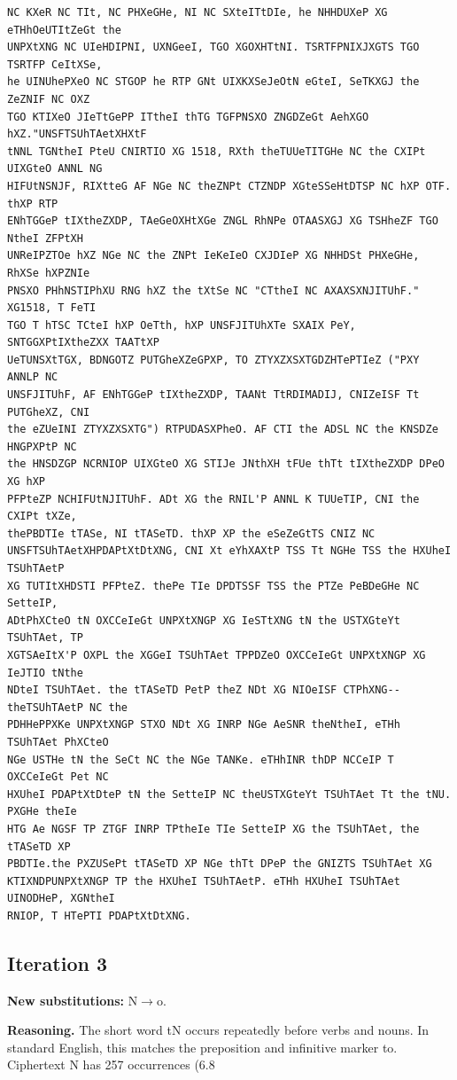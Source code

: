 \documentclass[12pt,a4paper]{article}
\begin{document}
\begin{lstlisting}[caption={Complete text after iteration 2}, label={lst:iter2}]
NC KXeR NC TIt, NC PHXeGHe, NI NC SXteITtDIe, he NHHDUXeP XG eTHhOeUTItZeGt the
UNPXtXNG NC UIeHDIPNI, UXNGeeI, TGO XGOXHTtNI. TSRTFPNIXJXGTS TGO TSRTFP CeItXSe,
he UINUhePXeO NC STGOP he RTP GNt UIXKXSeJeOtN eGteI, SeTKXGJ the ZeZNIF NC OXZ
TGO KTIXeO JIeTtGePP ITtheI thTG TGFPNSXO ZNGDZeGt AehXGO hXZ."UNSFTSUhTAetXHXtF
tNNL TGNtheI PteU CNIRTIO XG 1518, RXth theTUUeTITGHe NC the CXIPt UIXGteO ANNL NG
HIFUtNSNJF, RIXtteG AF NGe NC theZNPt CTZNDP XGteSSeHtDTSP NC hXP OTF. thXP RTP
ENhTGGeP tIXtheZXDP, TAeGeOXHtXGe ZNGL RhNPe OTAASXGJ XG TSHheZF TGO NtheI ZFPtXH
UNReIPZTOe hXZ NGe NC the ZNPt IeKeIeO CXJDIeP XG NHHDSt PHXeGHe, RhXSe hXPZNIe
PNSXO PHhNSTIPhXU RNG hXZ the tXtSe NC "CTtheI NC AXAXSXNJITUhF." XG1518, T FeTI
TGO T hTSC TCteI hXP OeTth, hXP UNSFJITUhXTe SXAIX PeY, SNTGGXPtIXtheZXX TAATtXP
UeTUNSXtTGX, BDNGOTZ PUTGheXZeGPXP, TO ZTYXZXSXTGDZHTePTIeZ ("PXY ANNLP NC
UNSFJITUhF, AF ENhTGGeP tIXtheZXDP, TAANt TtRDIMADIJ, CNIZeISF Tt PUTGheXZ, CNI
the eZUeINI ZTYXZXSXTG") RTPUDASXPheO. AF CTI the ADSL NC the KNSDZe HNGPXPtP NC
the HNSDZGP NCRNIOP UIXGteO XG STIJe JNthXH tFUe thTt tIXtheZXDP DPeO XG hXP
PFPteZP NCHIFUtNJITUhF. ADt XG the RNIL'P ANNL K TUUeTIP, CNI the CXIPt tXZe,
thePBDTIe tTASe, NI tTASeTD. thXP XP the eSeZeGtTS CNIZ NC
UNSFTSUhTAetXHPDAPtXtDtXNG, CNI Xt eYhXAXtP TSS Tt NGHe TSS the HXUheI TSUhTAetP
XG TUTItXHDSTI PFPteZ. thePe TIe DPDTSSF TSS the PTZe PeBDeGHe NC SetteIP,
ADtPhXCteO tN OXCCeIeGt UNPXtXNGP XG IeSTtXNG tN the USTXGteYt TSUhTAet, TP
XGTSAeItX'P OXPL the XGGeI TSUhTAet TPPDZeO OXCCeIeGt UNPXtXNGP XG IeJTIO tNthe
NDteI TSUhTAet. the tTASeTD PetP theZ NDt XG NIOeISF CTPhXNG--theTSUhTAetP NC the
PDHHePPXKe UNPXtXNGP STXO NDt XG INRP NGe AeSNR theNtheI, eTHh TSUhTAet PhXCteO
NGe USTHe tN the SeCt NC the NGe TANKe. eTHhINR thDP NCCeIP T OXCCeIeGt Pet NC
HXUheI PDAPtXtDteP tN the SetteIP NC theUSTXGteYt TSUhTAet Tt the tNU. PXGHe theIe
HTG Ae NGSF TP ZTGF INRP TPtheIe TIe SetteIP XG the TSUhTAet, the tTASeTD XP
PBDTIe.the PXZUSePt tTASeTD XP NGe thTt DPeP the GNIZTS TSUhTAet XG
KTIXNDPUNPXtXNGP TP the HXUheI TSUhTAetP. eTHh HXUheI TSUhTAet UINODHeP, XGNtheI
RNIOP, T HTePTI PDAPtXtDtXNG.
\end{lstlisting}

\clearpage
\subsection{Iteration 3}
\textbf{New substitutions:} N$\to$o.

\textbf{Reasoning.} The short word tN occurs repeatedly before verbs and nouns. In standard English, this matches the preposition and infinitive marker to. Ciphertext N has 257 occurrences (6.8%
\end{document}
